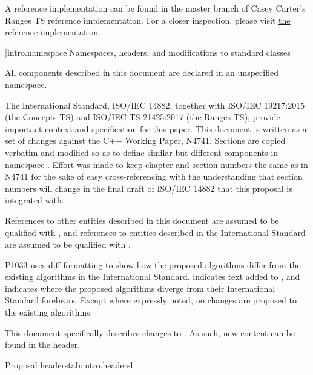 \pnum
A reference implementation can be found in the master branch of Casey Carter's Ranges TS reference
implementation. For a closer inspection, please visit
\href{https://github.com/CaseyCarter/cmcstl2/tree/master/include/stl2/detail/memory}{the reference implementation}.

[intro.namespace]{Namespaces, headers, and modifications to standard classes}

\pnum
All components described in this document are declared in an unspecified namespace.


\pnum
The International Standard, ISO/IEC 14882, together with ISO/IEC 19217:2015 (the Concepts TS) and
ISO/IEC TS 21425:2017 (the Ranges TS), provide important context and specification for this paper.
This document is written as a set of changes against the C++ Working Paper, N4741. Sections are
copied verbatim and modified so as to define similar but different components in namespace .
Effort was made to keep chapter and section numbers the same as in N4741 for the sake of easy
cross-referencing with the understanding that section numbers will change in the final draft of
ISO/IEC 14882 that this proposal is integrated with.

\pnum
References to other entities described in this document are assumed to be qualified with
, and references to entities described in the International Standard are
assumed to be qualified with .

\pnum
P1033 uses diff formatting to show how the proposed algorithms differ from the existing algorithms
in the International Standard.  indicates text added to
, and  indicates where the proposed algorithms diverge
from their International Standard forebears. Except where expressly noted, no changes are proposed
to the existing algorithms.

\pnum
This document specifically describes changes to . As such, new content can be found
in the  header.

\begin{floattable}{Proposal headers}{tab:intro.headers}{l}
\topline
{}\\
\bottomline
\end{floattable}

